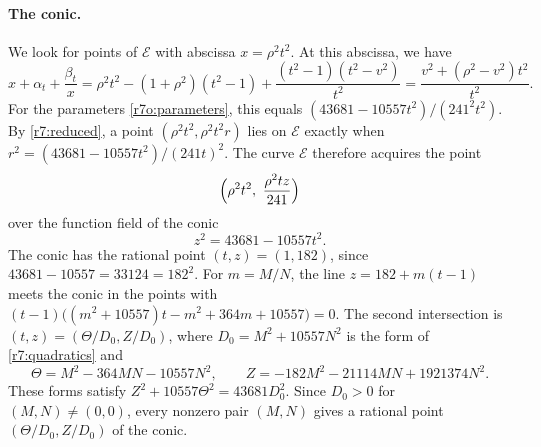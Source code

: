 \documentclass[12pt,oneside,openany]{book}
\theoremstyle{definition}
\theoremstyle{plain}
\numberwithin{equation}{chapter}
\theoremstyle{plain}
\theoremstyle{definition}
\theoremstyle{remark}
\begin{document}
\paragraph{The conic.} We look for points of $\mathcal E$ with abscissa
$x=\rho^2t^2$. At this abscissa, we have
\[
 x+\alpha_t+\frac{\beta_t}x
 =\rho^2t^2-(1+\rho^2)(t^2-1)+\frac{(t^2-1)(t^2-v^2)}{t^2}
 =\frac{v^2+(\rho^2-v^2)t^2}{t^2}.
\]
For the parameters \eqref{r7o:parameters}, this equals
$(43681-10557t^2)/(241^2t^2)$. By \eqref{r7:reduced}, a point
$(\rho^2t^2,\rho^2t^2r)$ lies on $\mathcal E$ exactly when
$r^2=(43681-10557t^2)/(241t)^2$. The curve $\mathcal E$ therefore acquires the
point
\begin{equation}\label{r7o:conic-point}
 \Bigl(\rho^2t^2,\ \frac{\rho^2tz}{241}\Bigr)
\end{equation}
over the function field of the conic
\begin{equation}\label{r7o:conic}
 z^2=43681-10557t^2.
\end{equation}
The conic has the rational point $(t,z)=(1,182)$, since
$43681-10557=33124=182^2$. For $m=M/N$, the line $z=182+m(t-1)$ meets the
conic in the points with
$(t-1)\bigl((m^2+10557)t-m^2+364m+10557\bigr)=0$. The second intersection
is $(t,z)=(\Theta/D_0,Z/D_0)$, where $D_0=M^2+10557N^2$ is the form of
\eqref{r7:quadratics} and
\begin{equation}\label{r7o:Theta}
 \Theta=M^2-364MN-10557N^2,\qquad Z=-182M^2-21114MN+1921374N^2.
\end{equation}
These forms satisfy $Z^2+10557\Theta^2=43681D_0^2$. Since $D_0>0$ for
$(M,N)\ne(0,0)$, every nonzero pair $(M,N)$ gives a rational point
$(\Theta/D_0,Z/D_0)$ of the conic.
\end{document}
